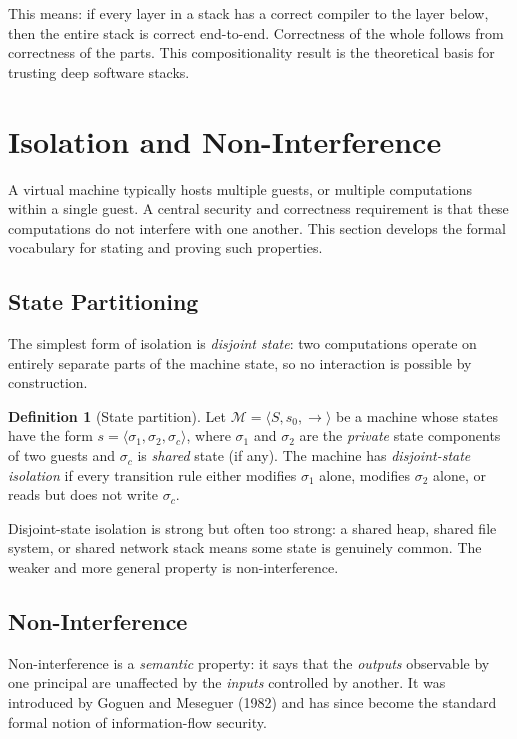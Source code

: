 \documentclass[11pt, a4paper]{article}
\theoremstyle{definition}
\newtheorem{definition}{Definition}[section]
\theoremstyle{plain}
\theoremstyle{remark}
\begin{document}
This means: if every layer in a stack has a correct compiler to the layer
below, then the entire stack is correct end-to-end. Correctness of the whole
follows from correctness of the parts. This compositionality result is the
theoretical basis for trusting deep software stacks.


\section{Isolation and Non-Interference}
\label{sec:isolation}

A virtual machine typically hosts multiple guests, or multiple computations
within a single guest. A central security and correctness requirement is that
these computations do not interfere with one another. This section develops
the formal vocabulary for stating and proving such properties.

\subsection{State Partitioning}

The simplest form of isolation is \emph{disjoint state}: two computations
operate on entirely separate parts of the machine state, so no interaction
is possible by construction.

\begin{definition}[State partition]
  Let $\mathcal{M} = \langle S, s_0, \to\rangle$ be a machine whose states have the form
  $s = \langle\sigma_1, \sigma_2, \sigma_c\rangle$, where $\sigma_1$ and $\sigma_2$ are
  the \emph{private} state components of two guests and $\sigma_c$ is
  \emph{shared} state (if any). The machine has \emph{disjoint-state
  isolation} if every transition rule either modifies $\sigma_1$ alone,
  modifies $\sigma_2$ alone, or reads but does not write $\sigma_c$.
\end{definition}

Disjoint-state isolation is strong but often too strong: a shared heap,
shared file system, or shared network stack means some state is genuinely
common. The weaker and more general property is non-interference.

\subsection{Non-Interference}

Non-interference is a \emph{semantic} property: it says that the
\emph{outputs} observable by one principal are unaffected by the
\emph{inputs} controlled by another. It was introduced by Goguen and Meseguer
(1982) and has since become the standard formal notion of information-flow
security.
\end{document}
